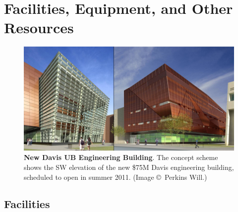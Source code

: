 \chapter{Facilities, Equipment, and Other Resources}
\thispagestyle{empty}


\begin{figure}[h!]
\centering
\includegraphics[width=\textwidth]{./figures/UBNewBuilding}
\caption{\textbf{New Davis UB Engineering Building}. The concept scheme shows the
SW elevation of the new \$75M Davis engineering building, scheduled to open in
summer 2011. (Image \copyright~Perkins Will.)}
\label{figure-newbuilding}
\end{figure}

\section{Facilities}

%

%

